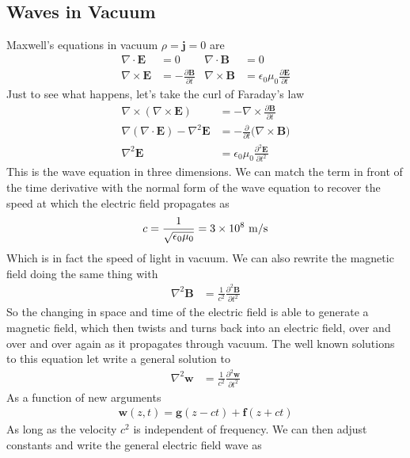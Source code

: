 \subsection{Waves in Vacuum}
Maxwell's equations in vacuum $\rho = \textbf{j} = 0$ are
\begin{align}
\nabla\cdot\textbf{E} &= 0 &\nabla\cdot\textbf{B} &= 0\\
\nabla\times\textbf{E} &= -\frac{\partial \textbf{B}}{\partial t} & \nabla\times\textbf{B} &= \epsilon_0\mu_0\frac{\partial \textbf{E}}{\partial t}
\end{align}
Just to see what happens, let's take the curl of Faraday's law
\begin{align}
\nabla\times(\nabla\times\textbf{E}) &= -\nabla\times\frac{\partial \textbf{B}}{\partial t}\\
\nabla(\nabla\cdot\textbf{E}) - \nabla^2\textbf{E} &= -\frac{\partial}{\partial t}\Big(\nabla\times\textbf{B}\Big)\\
\nabla^2\textbf{E} &= \epsilon_0\mu_0\frac{\partial^2\textbf{E}}{\partial t^2}
\end{align}
This is the wave equation in three dimensions. We can match the term in front of the time derivative with the normal form of the wave equation to recover the speed at which the electric field propagates as
\begin{align}
c = \frac{1}{\sqrt{\epsilon_0\mu_0}} = 3\times 10^8~\rm{m/s}
\end{align}
Which is in fact the speed of light in vacuum. We can also rewrite the magnetic field doing the same thing with
\begin{align}
\nabla^2\textbf{B} &= \frac{1}{c^2}\frac{\partial^2\textbf{B}}{\partial t^2}
\end{align}
So the changing in space and time of the electric field is able to generate a magnetic field, which then twists and turns back into an electric field, over and over and over again as it propagates through vacuum. The well known solutions to this equation let write a general solution to 
\begin{align}
\nabla^2\textbf{w} &= \frac{1}{c^2}\frac{\partial^2\textbf{w}}{\partial t^2}
\end{align}
As a function of new arguments
\begin{align}
\textbf{w}(z, t) = \textbf{g}(z-ct) + \textbf{f}(z+ct)
\end{align}
As long as the velocity $c^2$ is independent of frequency. We can then adjust constants and write the general electric field wave as
